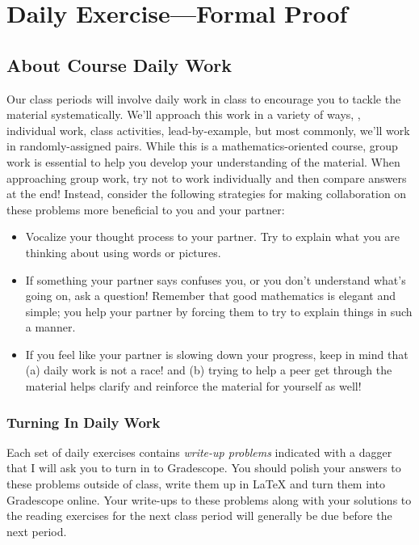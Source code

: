 \documentclass[11pt]{book}
\newcommand{\doctitle}{Daily Exercise---Formal Proof}
\begin{document}
\chapter{\doctitle}

\section{About Course Daily Work}

Our class periods will involve daily work in class to encourage you to tackle the material systematically.
We'll approach this work in a variety of ways, \eg, individual work, class activities, lead-by-example, but most commonly, we'll work in randomly-assigned pairs.
While this is a mathematics-oriented course, group work is essential to help you develop your understanding of the material.
When approaching group work, try not to work individually and then compare answers at the end!
Instead, consider the following strategies for making collaboration on these problems more beneficial to you and your partner:
\begin{itemize}
  \item Vocalize your thought process to your partner.
    Try to explain what you are thinking about using words or pictures.
  \item If something your partner says confuses you, or you don't understand what's going on, ask a question!
    Remember that good mathematics is elegant and simple; you help your partner by forcing them to try to explain things in such a manner.
  \item If you feel like your partner is slowing down your progress, keep in mind that (a) daily work is not a race! and (b) trying to help a peer get through the material helps clarify and reinforce the material for yourself as well!
\end{itemize}

\subsection{Turning In Daily Work}

Each set of daily exercises contains \emph{write-up problems} indicated with a dagger \turninproblem{} that I will ask you to turn in to Gradescope.
You should polish your answers to these problems outside of class, write them up in \LaTeX{} and turn them into Gradescope online.
Your write-ups to these problems along with your solutions to the reading exercises for the next class period will generally be due before the next period.
\end{document}
